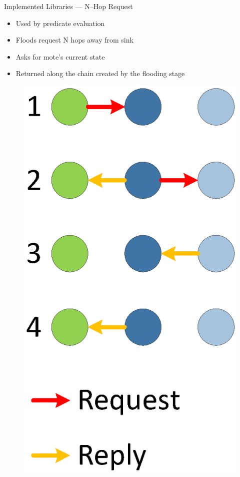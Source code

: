 \documentclass[usenames,dvipsnames]{beamer}
\begin{document}
\begin{frame}{Implemented Libraries --- N--Hop Request}
	\begin{itemize}
		\item Used by predicate evaluation
		\item Floods request N hops away from sink
		\item Asks for mote's current state
		\item Returned along the chain created by the flooding stage
	\end{itemize}

\begin{figure}[H]
\includegraphics[scale=0.3]{../Report/Diagrams/n-hop-flood-req-reply.eps}\hspace{1em}

\end{figure}
\end{frame}
\end{document}
